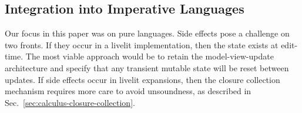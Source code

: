 


\subsection{Integration into Imperative Languages}
\label{sec:imperative-langs}
Our focus in this paper was on pure languages.
Side effects pose a challenge on two fronts.
If they occur in a livelit implementation,
then the state exists at edit-time. 
The most viable approach would be to retain the model-view-update
architecture and specify that any transient mutable state will be reset between updates.
If side effects occur in livelit expansions, 
then the closure collection mechanism requires more 
care to avoid unsoundness, as described in Sec.~\ref{sec:calculus-closure-collection}.


